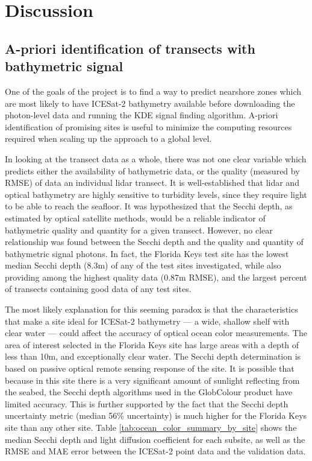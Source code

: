 \chapter{Discussion}

\section{A-priori identification of transects with bathymetric signal}
 One of the goals of the project is to find a way to predict nearshore zones which are most likely to have ICESat-2 bathymetry available before downloading the photon-level data and running the KDE signal finding algorithm. A-priori identification of promising sites is useful to minimize the computing resources required when scaling up the approach to a global level.

In looking at the transect data as a whole, there was not one clear variable which predicts either the availability of bathymetric data, or the quality  (measured by RMSE) of data an individual lidar transect. It is well-established that lidar and optical bathymetry are highly sensitive to turbidity levels, since they require light to be able to reach the seafloor. It was hypothesized that the Secchi depth, as estimated by optical satellite methods, would be a reliable indicator of bathymetric quality and quantity for a given transect. However, no clear relationship was found between the Secchi depth and the quality and quantity of bathymetric signal photons. In fact, the Florida Keys test site has the lowest median Secchi depth (8.3m) of any of the test sites investigated, while also providing among the highest quality data (0.87m RMSE), and the largest percent of transects containing good data of any test sites. 

The most likely explanation for this seeming paradox is that the characteristics that make a site ideal for ICESat-2 bathymetry --- a wide, shallow shelf with clear water --- could affect the accuracy of optical ocean color measurements. The area of interest selected in the Florida Keys site has large areas with a depth of less than 10m, and exceptionally clear water. The Secchi depth determination is based on passive optical remote sensing response of the site. It is possible that because in this site there is a very significant amount of sunlight reflecting from the seabed, the Secchi depth algorithms used in the GlobColour product have limited accuracy. This is further supported by the fact that the Secchi depth uncertainty metric (median 56\% uncertainty) is much higher for the Florida Keys site than any other site. Table \ref{tab:ocean_color_summary_by_site} shows the median Secchi depth and light diffusion coefficient for each subsite, as well as the RMSE and MAE error between the ICESat-2 point data and the validation data.


